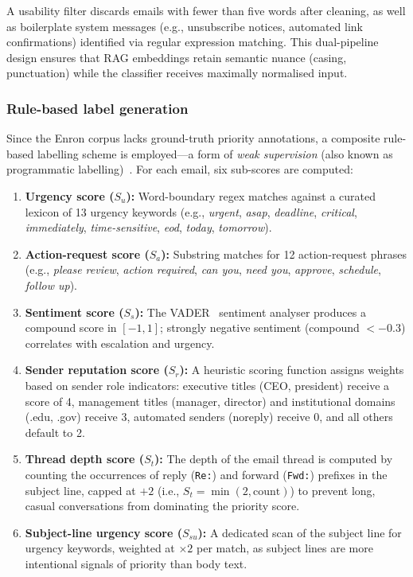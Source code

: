 \documentclass[3p,times,procedia]{elsarticle}
\begin{document}
A usability filter discards emails with fewer than five words after cleaning, as well as boilerplate system messages (e.g., unsubscribe notices, automated link confirmations) identified via regular expression matching. This dual-pipeline design ensures that RAG embeddings retain semantic nuance (casing, punctuation) while the classifier receives maximally normalised input.

\subsubsection{Rule-based label generation}

Since the Enron corpus lacks ground-truth priority annotations, a composite rule-based labelling scheme is employed---a form of \textit{weak supervision} (also known as programmatic labelling)~\cite{ratner2017}. For each email, six sub-scores are computed:

\begin{enumerate}
\item \textbf{Urgency score ($S_u$):} Word-boundary regex matches against a curated lexicon of 13 urgency keywords (e.g., \textit{urgent}, \textit{asap}, \textit{deadline}, \textit{critical}, \textit{immediately}, \textit{time-sensitive}, \textit{eod}, \textit{today}, \textit{tomorrow}).
\item \textbf{Action-request score ($S_a$):} Substring matches for 12 action-request phrases (e.g., \textit{please review}, \textit{action required}, \textit{can you}, \textit{need you}, \textit{approve}, \textit{schedule}, \textit{follow up}).
\item \textbf{Sentiment score ($S_s$):} The VADER~\cite{hutto2014} sentiment analyser produces a compound score in $[-1, 1]$; strongly negative sentiment (compound $< -0.3$) correlates with escalation and urgency.
\item \textbf{Sender reputation score ($S_r$):} A heuristic scoring function assigns weights based on sender role indicators: executive titles (CEO, president) receive a score of 4, management titles (manager, director) and institutional domains (.edu, .gov) receive 3, automated senders (noreply) receive 0, and all others default to 2.
\item \textbf{Thread depth score ($S_t$):} The depth of the email thread is computed by counting the occurrences of reply (\texttt{Re:}) and forward (\texttt{Fwd:}) prefixes in the subject line, capped at $+2$ (i.e., $S_t = \min(2, \text{count})$) to prevent long, casual conversations from dominating the priority score.
\item \textbf{Subject-line urgency score ($S_{su}$):} A dedicated scan of the subject line for urgency keywords, weighted at $\times 2$ per match, as subject lines are more intentional signals of priority than body text.
\end{enumerate}
\end{document}
